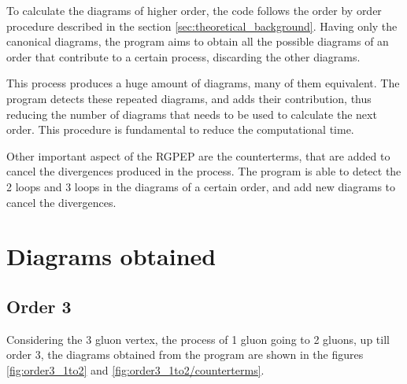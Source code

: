 \documentclass[11pt,a4paper,twoside,pdf]{article}
\numberwithin{equation}{section}
\begin{document}
To calculate the diagrams of higher order, the code follows the order by order 
procedure described in the section \ref{sec:theoretical_background}. Having only the
canonical diagrams, the program aims to obtain all the possible diagrams of an order
that contribute to a certain process, discarding the other diagrams.

This process produces a huge amount of diagrams, many of them equivalent. The 
program detects these repeated diagrams, and adds their contribution, thus reducing 
the number of diagrams that needs to be used to calculate the next order. This procedure
is fundamental to reduce the computational time.

Other important aspect of the RGPEP are the counterterms, that are added to cancel 
the divergences produced in the process. The program is able to detect the 2 loops
and 3 loops in the diagrams of a certain order, and add new diagrams to cancel the 
divergences. 




\section{Diagrams obtained} \label{sec:diagrams}


\subsection{Order 3}

Considering the 3 gluon vertex, the process of 1 gluon going to 2 gluons, up till 
order 3, the diagrams obtained from the program are shown in the figures 
\ref{fig:order3_1to2} and \ref{fig:order3_1to2/counterterms}.
\end{document}
